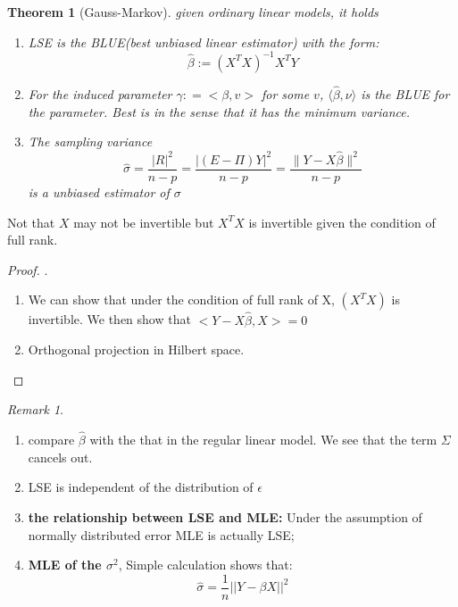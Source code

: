 \documentclass[a4paper,12pt, oneside, fleqn]{book}
\newtheorem{theorem}{Theorem}[section]
\theoremstyle{definition}
\theoremstyle{remark}
\newtheorem*{remark}{Remark}
\begin{document}
\begin{theorem}[Gauss-Markov]
given ordinary linear models, it holds
\begin{enumerate}
    \item LSE is the BLUE(best unbiased linear estimator) with the  form:
    \begin{equation}
        \hat{\beta} := (X^TX)^{-1}X^TY
    \end{equation}
    \item For the induced parameter $\gamma: = <\beta, v>$ for some $v$, $\langle \hat{\beta}, \nu \rangle$ is the BLUE for the parameter. Best is in the sense that it has the minimum variance.
    \item The sampling variance
    \begin{equation}
    \hat{\sigma} = \frac{|R|^2}{n - p} = \frac{|(E - \Pi)Y|^2}{n - p} =  \frac{\|Y - X\hat{\beta}\|^2}{n - p} 
    \end{equation}
    is a unbiased estimator of $\sigma$
\end{enumerate}
\end{theorem}
Not that $X$ may not be invertible but $X^T X$ is invertible given the condition of full rank.

\begin{proof}.
\begin{enumerate}
    \item We can show that under the condition of full rank of X, $(X^T X)$ is invertible. We then show that $<Y - X\hat{\beta}, X> = 0$
    \item Orthogonal projection in Hilbert space.
    
\end{enumerate}
\end{proof}

\begin{remark}\quad
\begin{enumerate}
    \item compare $\hat{\beta}$ with the that in the regular linear model. We see that the term $\Sigma$ cancels out.
    \item LSE is independent of the distribution of $\epsilon$
    \item \textbf{the relationship between LSE and MLE:} Under the assumption of normally distributed error MLE is actually LSE;
    \item \textbf{MLE of the $\sigma^2$}, Simple calculation shows that: \begin{equation*}
        \hat{\sigma} = \frac{1}{n} ||Y - \beta X||^2
    \end{equation*}
\end{enumerate}
\end{remark}
\end{document}
